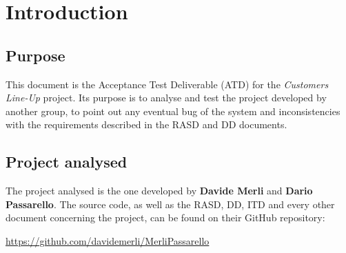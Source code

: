 \chapter{Introduction}

\section{Purpose}
This document is the Acceptance Test Deliverable (ATD) for the \textit{Customers Line-Up} project. Its purpose is to analyse and test the project developed by another group, to point out any eventual bug of the system and inconsistencies with the requirements described in the RASD and DD documents.


\section{Project analysed}
The project analysed is the one developed by \textbf{Davide Merli} and \textbf{Dario Passarello}.\newline
The source code, as well as the RASD, DD, ITD and every other document concerning the project, can be found on their GitHub repository:

\href{https://github.com/davidemerli/MerliPassarello}{https://github.com/davidemerli/MerliPassarello}
